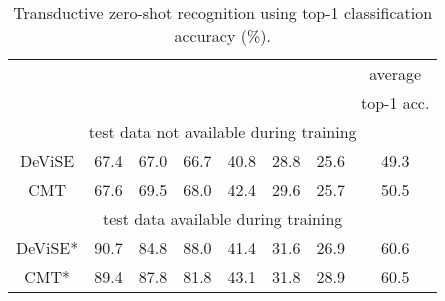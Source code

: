 {{\begin{table}[t!]
\centering
\caption{\footnotesize Transductive zero-shot recognition using top-1 classification accuracy (\%). }
\vspace{1mm}
\scalebox{0.72}
{
\begin{tabular}{|c||lll||lll||c|}
\hline
 & \multicolumn{3}{c||}{}                                                      & \multicolumn{3}{c||}{}                                                     & average                          \\
                        & \multicolumn{1}{c}{} & \multicolumn{1}{c}{} & \multicolumn{1}{c||}{} & \multicolumn{1}{c}{} & \multicolumn{1}{c}{} & \multicolumn{1}{c||}{} & top-1 acc. \\ \hline\hline
\multicolumn{8}{|c|}{test data not available during training}                                                                                                                                                                                     \\ \hline \hline
DeViSE \cite{frome2013devise}                  &           67.4               &           67.0             &        66.7                  &            40.8             &          28.8               &              25.6            &        49.3                         \\
CMT \cite{socher2013zero}                    &               67.6           &             69.5            &           68.0               &               42.4          &             29.6            &            25.7              &        50.5                         \\ \hline \hline
\multicolumn{8}{|c|}{test data available during training}                                                                                                                                                                                        \\ \hline \hline
DeViSE* \cite{frome2013devise}                &            90.7              &           84.8            &        88.0                  &           41.4              &            31.6             &              26.9            &       60.6                          \\
CMT* \cite{socher2013zero}                   &              89.4            &              87.8           &             81.8             &               43.1          &             31.8          &              28.9            &         60.5                       \\

\end{tabular}}
\end{table}}}
